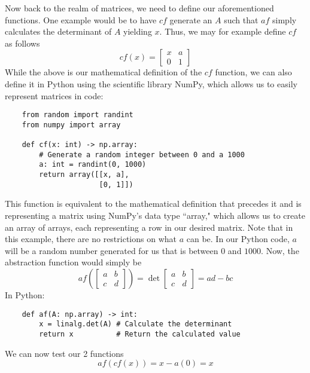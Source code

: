 Now back to the realm of matrices, we need to define our aforementioned
functions. One example would be to have $ cf $ generate an $ A $ such that $ af
$ simply calculates the determinant of $ A $ yielding $ x $. Thus, we may for
example define $ cf $ as follows
\begin{equation*}
    cf(x)
    =
    \begin{bmatrix}
        x & a \\
        0 & 1
    \end{bmatrix}
\end{equation*}
While the above is our mathematical definition of the $ cf $ function, we can
also define it in Python using the scientific library NumPy, which allows us to
easily represent matrices in code:
\begin{verbatim}
    from random import randint
    from numpy import array

    def cf(x: int) -> np.array:
        # Generate a random integer between 0 and a 1000
        a: int = randint(0, 1000)
        return array([[x, a],
                      [0, 1]])
\end{verbatim}
This function is equivalent to the mathematical definition that precedes it and
is representing a matrix using NumPy's data type ``array," which allows us to
create an array of arrays, each representing a row in our desired matrix. Note
that in this example, there are no restrictions on what $ a $ can be. In our
Python code, $ a $ will be a random number generated for us that is between $ 0
$ and $ 1000 $. Now, the abstraction
function would simply be
\begin{equation*}
    af \left(
    \begin{bmatrix}
        a & b \\
        c & d
    \end{bmatrix}
    \right)
    =
    \det
    \begin{bmatrix}
        a & b \\
        c & d
    \end{bmatrix}
    = ad - bc
\end{equation*}
In Python:
\begin{verbatim}
    def af(A: np.array) -> int:
        x = linalg.det(A) # Calculate the determinant
        return x          # Return the calculated value
\end{verbatim}
We can now test our 2 functions
\begin{equation*}
    af(cf(x)) = x - a(0) = x
\end{equation*}
